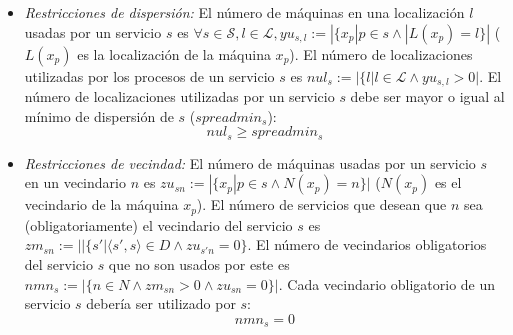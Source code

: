 \begin{itemize}
	\item\textit{Restricciones de dispersión:} El número de máquinas en una localización $l$ usadas por un servicio $s$ es $\forall s \in \mathcal{S}, l \in \mathcal{L},yu_{s,l}:=|\{x_p|p\in s \wedge|L(x_p)=l\}|$ ($L(x_p)$ es la localización de la máquina $x_p$). El número de localizaciones utilizadas por los procesos de un servicio $s$ es $nul_{s}:=|\{l|l\in \mathcal{L}\wedge yu_{s,l}>0|$. El número de localizaciones utilizadas por un servicio $s$ debe ser mayor o igual al mínimo de dispersión de $s$ ($spreadmin_s$):
		\begin{equation}\label{modelo2:r4}
			nul_s \geq spreadmin_s
		\end{equation}
	\item\textit{Restricciones de vecindad:} El número de máquinas usadas por un servicio $s$ en un vecindario $n$ es $zu_{sn}:=|\{x_p|p\in s \wedge N(x_p)=n\}|$ ($N(x_p)$ es el vecindario de la máquina $x_p$). El número de servicios que desean que $n$ sea (obligatoriamente) el vecindario del servicio $s$ es $zm_{sn}:=||\{s'|\langle s',s\rangle \in D \wedge zu_{s'n}=0\}$. El número de vecindarios obligatorios del servicio $s$ que no son usados por este es $nmn_s:=|\{n \in N \wedge zm_{sn} > 0 \wedge zu_{sn} = 0 \}|$. Cada vecindario obligatorio de un servicio $s$ debería ser utilizado por $s$:
	\begin{equation}\label{modelo2:r5}
		nmn_s = 0
	\end{equation}
		 
\end{itemize}

